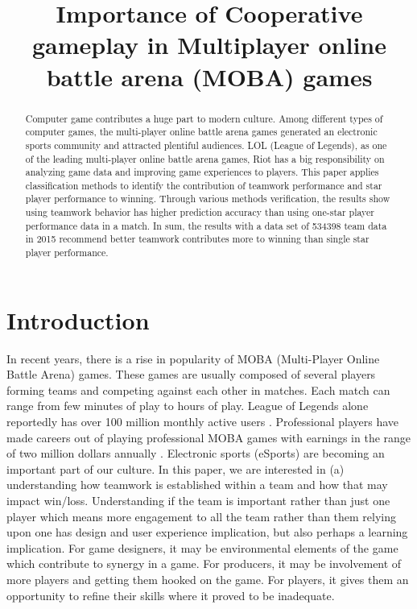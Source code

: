 \documentclass[conference]{IEEEtran}
\begin{document}
	
\title{Importance of Cooperative gameplay in Multiplayer online battle arena (MOBA) games}


\author{

}

\maketitle

\begin{abstract}
Computer game contributes a huge part to modern culture. Among different types of computer games, the multi-player online battle arena games generated an electronic sports community and attracted plentiful audiences. LOL (League of Legends), as one of the leading multi-player online battle arena games, Riot has a big responsibility on analyzing game data and improving game experiences to players. This paper applies classification methods to identify the contribution of teamwork performance and star player performance to winning. Through various methods verification, the results show using teamwork behavior has higher prediction accuracy than using one-star player performance data in a match. In sum, the results with a data set of 534398 team data in 2015 recommend better teamwork contributes more to winning than single star player performance.
\end{abstract}

\IEEEpeerreviewmaketitle



\section{Introduction}

In recent years, there is a rise in popularity of MOBA (Multi-Player Online Battle Arena) games. These games are usually composed of several players forming teams and competing against each other in matches. Each match can range from few minutes of play to hours of play. League of Legends alone reportedly has over 100 million monthly active users \cite{Loterina}. Professional players have made careers out of playing professional MOBA games with earnings in the range of two million dollars annually \cite{esports}. Electronic sports (eSports) are becoming an important part of our culture. In this paper, we are interested in (a) understanding how teamwork is established within a team and how that may impact win/loss. Understanding if the team is important rather than just one player which means more engagement to all the team rather than them relying upon one has design and user experience implication, but also perhaps a learning implication. For game designers, it may be environmental elements of the game which contribute to synergy in a game. For producers, it may be involvement of more players and getting them hooked on the game. For players, it gives them an opportunity to refine their skills where it proved to be inadequate.
\end{document}
